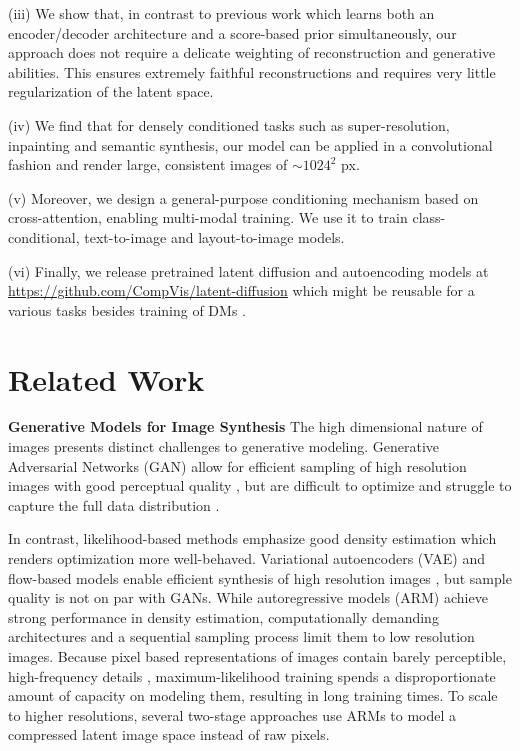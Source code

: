 (iii) We show that, in contrast to previous work \cite{DBLP:journals/corr/abs-2106-05931} which learns both an encoder/decoder architecture and a score-based prior simultaneously, our approach does not require a delicate weighting of reconstruction and generative abilities. This ensures extremely faithful reconstructions and requires very little regularization of the latent space.

(iv) We find that for densely conditioned tasks such as super-resolution, inpainting and semantic synthesis, our model can be applied in a convolutional fashion and render large, consistent images of $\sim 1024^2$ px.

(v) Moreover, we design a general-purpose conditioning mechanism based on cross-attention, enabling multi-modal training. We use it to train class-conditional, text-to-image and layout-to-image models.

(vi) Finally, we release pretrained latent diffusion and autoencoding models at \url{https://github.com/CompVis/latent-diffusion} 
which might be reusable for a various tasks besides training of DMs \cite{clipguiding}. 

\section{Related Work}
\enlargethispage{\baselineskip}

\textbf{Generative Models for Image Synthesis} The high dimensional nature of images presents distinct challenges to generative modeling. Generative Adversarial Networks (GAN) \cite{goodfellow2014GAN} allow for efficient sampling of high resolution images with good perceptual quality \cite{bigganbrock, DBLP:journals/corr/abs-1912-04958}, but are difficult to optimize \cite{DBLP:journals/corr/abs-1801-04406,arjovsky2017wasserstein, gulrajani2017improved} and struggle to capture the full data distribution \cite{DBLP:conf/iclr/MetzPPS17}. 

In contrast, likelihood-based methods emphasize good density estimation which renders optimization more well-behaved. Variational autoencoders (VAE) \cite{VAE} and flow-based models \cite{dinh2015nice, DBLP:conf/iclr/DinhSB17} enable efficient synthesis of high resolution images \cite{DBLP:journals/corr/abs-2011-10650, DBLP:conf/nips/VahdatK20, glow}, but sample quality is not on par with GANs. While autoregressive models (ARM) \cite{DBLP:journals/corr/OordKK16,
NIPS2016_b1301141, DBLP:conf/icml/ChenRC0JLS20, DBLP:journals/corr/abs-1904-10509} achieve strong performance in density estimation, computationally demanding architectures \cite{DBLP:conf/nips/VaswaniSPUJGKP17} and a sequential sampling process limit them to low resolution images. Because pixel based representations of images contain barely perceptible, high-frequency details \cite{dieleman2020typicality,
DBLP:journals/corr/SalimansKCK17}, maximum-likelihood training spends a disproportionate amount of capacity on modeling them, resulting in long training times. To scale to higher resolutions, several two-stage approaches \cite{DBLP:journals/corr/abs-2104-10157, DBLP:conf/nips/RazaviOV19, DBLP:journals/corr/abs-2012-09841, yu2021vectorquantized} use ARMs to model a compressed latent image space instead of raw pixels.

